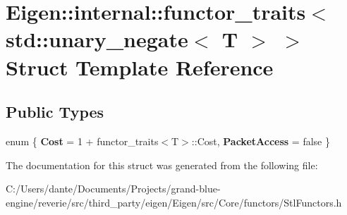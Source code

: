 \hypertarget{struct_eigen_1_1internal_1_1functor__traits_3_01std_1_1unary__negate_3_01_t_01_4_01_4}{}\section{Eigen\+::internal\+::functor\+\_\+traits$<$ std\+::unary\+\_\+negate$<$ T $>$ $>$ Struct Template Reference}
\label{struct_eigen_1_1internal_1_1functor__traits_3_01std_1_1unary__negate_3_01_t_01_4_01_4}
\subsection*{Public Types}
\begin{DoxyCompactItemize}
\item 
\mbox{\label{struct_eigen_1_1internal_1_1functor__traits_3_01std_1_1unary__negate_3_01_t_01_4_01_4_a353c0700c7b89639d5178736729f00f5}} 
enum \{ {\bfseries Cost} = 1 + functor\+\_\+traits$<$T$>$\+::Cost, 
{\bfseries Packet\+Access} = false
 \}
\end{DoxyCompactItemize}


The documentation for this struct was generated from the following file\+:\begin{DoxyCompactItemize}
\item 
C\+:/\+Users/dante/\+Documents/\+Projects/grand-\/blue-\/engine/reverie/src/third\+\_\+party/eigen/\+Eigen/src/\+Core/functors/Stl\+Functors.\+h\end{DoxyCompactItemize}
